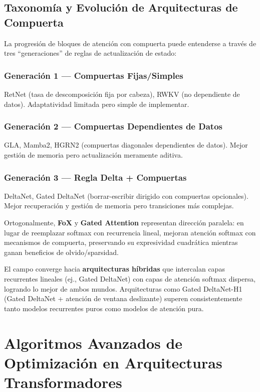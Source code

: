 \documentclass[11pt,a4paper]{article}
\begin{document}
\subsection{Taxonomía y Evolución de Arquitecturas de Compuerta}

La progresión de bloques de atención con compuerta puede entenderse a través de tres ``generaciones'' de reglas de actualización de estado:

\subsubsection{Generación 1 --- Compuertas Fijas/Simples}

RetNet (tasa de descomposición fija por cabeza), RWKV (no dependiente de datos). Adaptatividad limitada pero simple de implementar.

\subsubsection{Generación 2 --- Compuertas Dependientes de Datos}

GLA, Mamba2, HGRN2 (compuertas diagonales dependientes de datos). Mejor gestión de memoria pero actualización meramente aditiva.

\subsubsection{Generación 3 --- Regla Delta + Compuertas}

DeltaNet, Gated DeltaNet (borrar-escribir dirigido con compuertas opcionales). Mejor recuperación y gestión de memoria pero transiciones más complejas.

Ortogonalmente, \textbf{FoX} y \textbf{Gated Attention} representan dirección paralela: en lugar de reemplazar softmax con recurrencia lineal, mejoran atención softmax con mecanismos de compuerta, preservando su expresividad cuadrática mientras ganan beneficios de olvido/sparsidad.

El campo converge hacia \textbf{arquitecturas híbridas} que intercalan capas recurrentes lineales (ej., Gated DeltaNet) con capas de atención softmax dispersa, logrando lo mejor de ambos mundos. Arquitecturas como Gated DeltaNet-H1 (Gated DeltaNet + atención de ventana deslizante) superen consistentemente tanto modelos recurrentes puros como modelos de atención pura.

\appendix

\section{Algoritmos Avanzados de Optimización en Arquitecturas Transformadores}
\label{apx:optimizers}
\end{document}
